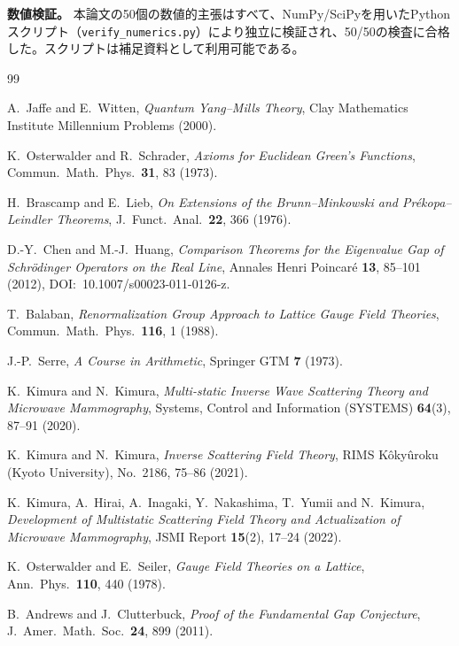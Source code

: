 \documentclass[12pt]{article}
\theoremstyle{plain}
\theoremstyle{definition}
\numberwithin{equation}{section}
\begin{document}
\medskip

\noindent\textbf{数値検証。} 本論文の50個の数値的主張はすべて、NumPy/SciPyを用いたPythonスクリプト（\texttt{verify\_numerics.py}）により独立に検証され、50/50の検査に合格した。スクリプトは補足資料として利用可能である。

\newpage
\begin{thebibliography}{99}

A.~Jaffe and E.~Witten,
\textit{Quantum Yang--Mills Theory},
Clay Mathematics Institute Millennium Problems (2000).

K.~Osterwalder and R.~Schrader,
\textit{Axioms for Euclidean Green's Functions},
Commun.\ Math.\ Phys.\ \textbf{31}, 83 (1973).

H.~Brascamp and E.~Lieb,
\textit{On Extensions of the Brunn--Minkowski and Pr\'ekopa--Leindler Theorems},
J.~Funct.\ Anal.\ \textbf{22}, 366 (1976).

D.-Y.~Chen and M.-J.~Huang,
\textit{Comparison Theorems for the Eigenvalue Gap of Schr\"odinger Operators on the Real Line},
Annales Henri Poincar\'e \textbf{13}, 85--101 (2012),
DOI:~10.1007/s00023-011-0126-z.

T.~Balaban,
\textit{Renormalization Group Approach to Lattice Gauge Field Theories},
Commun.\ Math.\ Phys.\ \textbf{116}, 1 (1988).

J.-P.~Serre,
\textit{A Course in Arithmetic},
Springer GTM \textbf{7} (1973).

K.~Kimura and N.~Kimura,
\textit{Multi-static Inverse Wave Scattering Theory and Microwave Mammography},
Systems, Control and Information (SYSTEMS) \textbf{64}(3), 87--91 (2020).

K.~Kimura and N.~Kimura,
\textit{Inverse Scattering Field Theory},
RIMS K\^oky\^uroku (Kyoto University), No.~2186, 75--86 (2021).

K.~Kimura, A.~Hirai, A.~Inagaki, Y.~Nakashima, T.~Yumii and N.~Kimura,
\textit{Development of Multistatic Scattering Field Theory and Actualization of Microwave Mammography},
JSMI Report \textbf{15}(2), 17--24 (2022).

K.~Osterwalder and E.~Seiler,
\textit{Gauge Field Theories on a Lattice},
Ann.\ Phys.\ \textbf{110}, 440 (1978).

B.~Andrews and J.~Clutterbuck,
\textit{Proof of the Fundamental Gap Conjecture},
J.~Amer.\ Math.\ Soc.\ \textbf{24}, 899 (2011).

\end{thebibliography}
\end{document}
